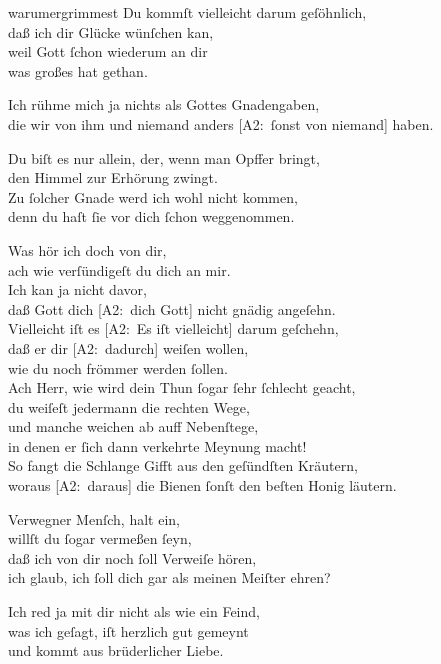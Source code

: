 \documentclass[abbrwidth=6em,tocstyle=ref-genre]{ees}
\newcommand\altlyrics[1]{[\textmd{A2}:~#1]}
\begin{document}
{\begin{movement}{warumergrimmest}
  \voice[Cain]
  Du kommſt vielleicht darum geſöhnlich,\\
  daß ich dir Glücke wünſchen kan,\\
  weil Gott ſchon wiederum an dir\\
  was großes hat gethan.

  \voice[Abel]
  Ich rühme mich ja nichts als Gottes Gnadengaben,\\
  die wir von ihm und niemand anders \altlyrics{ſonst von niemand} haben.

  \voice[Cain]
  Du biſt es nur allein, der, wenn man Opffer bringt,\\
  den Himmel zur Erhörung zwingt.\\
  Zu ſolcher Gnade werd ich wohl nicht kommen,\\
  denn du haſt ſie vor dich ſchon weggenommen.

  \voice[Abel]
  Was hör ich doch von dir,\\
  ach wie verſündigeſt du dich an mir.\\
  Ich kan ja nicht davor,\\
  daß Gott dich \altlyrics{dich Gott} nicht gnädig angeſehn.\\
  Vielleicht iſt es \altlyrics{Es iſt vielleicht} darum geſchehn,\\
  daß er dir \altlyrics{dadurch} weiſen wollen,\\
  wie du noch frömmer werden ſollen.\\
  Ach Herr, wie wird dein Thun ſogar ſehr ſchlecht geacht,\\
  du weiſeſt jedermann die rechten Wege,\\
  und manche weichen ab auff Nebenſtege,\\
  in denen er ſich dann verkehrte Meynung macht!\\
  So fangt die Schlange Gifft aus den geſündſten Kräutern,\\
  woraus \altlyrics{daraus} die Bienen ſonſt den beſten Honig läutern.

  \voice[Cain]
  Verwegner Menſch, halt ein,\\
  willſt du ſogar vermeßen ſeyn,\\
  daß ich von dir noch ſoll Verweiſe hören,\\
  ich glaub, ich ſoll dich gar als meinen Meiſter ehren?

  \voice[Abel]
  Ich red ja mit dir nicht als wie ein Feind,\\
  was ich geſagt, iſt herzlich gut gemeynt\\
  und kommt aus brüderlicher Liebe.


\end{movement}}
\end{document}

